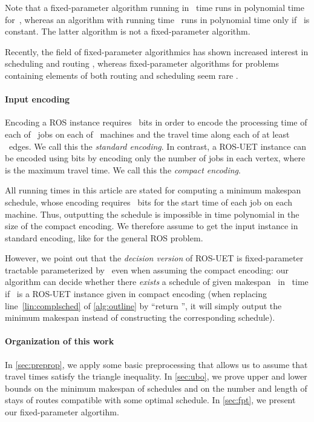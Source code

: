 \documentclass[natbib,sort,smallextended,envcountsame,envcountsect,numbook]{svjour3}
\newcommand{\ROS}{\textsc{ROS}}
\newcommand{\ROSUPT}{\textsc{ROS-UET}}
\begin{document}
Note that a fixed-parameter algorithm
running in ~time
runs in polynomial time for~,
whereas an algorithm with running time~
runs in polynomial time only if ~is constant.
The latter algorithm is not a fixed-parameter algorithm.


Recently, the field of fixed-parameter algorithmics
has shown increased interest in scheduling and routing
\citep{CMY+17,BBB+16b,BCH+15,BMNW15,BNS16,BF95,FM03,HK06,
  HKS+15,MW15,BKS17,BNSW14,DMNW13,GWY17,GJW16,GJS17,GMY13,JMS17,KM14,
  SBNW11,SBNW12},
whereas fixed-parameter algorithms for problems
containing elements of both routing and scheduling
seem rare \citep{BHKK07}.


\paragraph{Input encoding}
Encoding a \ROS{} instance
requires ~bits
in order to encode the processing time of each of ~jobs
on each of ~machines
and the travel time along each of at least ~edges.
We call this the \emph{standard encoding}.
In contrast, a \ROSUPT{} instance
can be encoded using
 bits
by encoding only the number of jobs in each vertex, where  is the maximum travel time.  We call this the \emph{compact encoding}.

All running times in this article are stated
for computing a minimum makespan schedule,
whose encoding requires ~bits
for the start time of each job on each machine.
Thus,
outputting the schedule is impossible
in time polynomial in the size of the compact encoding.
We therefore assume
to get the input instance in standard encoding,
like for the general \ROS{} problem.


However, we point out that the \emph{decision version} of \ROSUPT{}
is fixed-parameter tractable
parameterized by~
even when assuming the compact encoding:
our algorithm can decide whether
there \emph{exists} a schedule of given makespan~
in ~time
if ~is a \ROSUPT{} instance given in compact encoding
(when replacing line~\ref{lin:complsched} of \cref{alg:outline}
by ``return '', it will simply output the minimum makespan
instead of constructing the corresponding schedule).

\paragraph{Organization of this work}
In \cref{sec:preprop},
we apply some basic preprocessing
that allows us to
assume  that travel times
satisfy the triangle inequality.
In \cref{sec:ubo},
we prove upper and lower bounds
on the minimum makespan of schedules
and on the number and length of stays
of routes compatible with some optimal schedule.
In \cref{sec:fpt}, we present our fixed-parameter algortihm.
\end{document}
